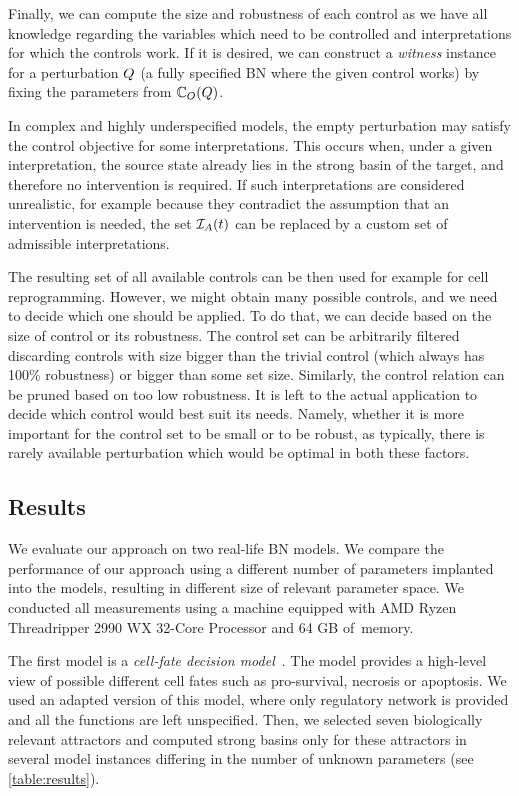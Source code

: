 Finally, we can compute the size and robustness of each control as we have all knowledge regarding the variables which need to be controlled and interpretations for which the controls work. If it is desired, we can construct a \emph{witness} \PBN{} instance for a perturbation $Q$ (a fully specified BN where the given control works) by fixing the parameters from $\mathbb{C}_O(Q)$.

In complex and highly underspecified models, the empty perturbation
\emptyPerturbation may satisfy the control objective for some
interpretations. This occurs when, under a given interpretation, the source
state already lies in the strong basin of the target, and therefore no
intervention is required. If such interpretations are considered unrealistic,
for example because they contradict the assumption that an intervention is
needed, the set $\mathcal{I}_A(t)$ can be replaced by a custom set of
admissible interpretations.

The resulting set of all available controls can be then used for example for cell reprogramming. However, we might obtain many possible controls, and we need to decide which one should be applied. To do that, we can decide based on the size of control or its robustness. The control set can be arbitrarily filtered discarding controls with size bigger than the trivial control (which always has 100\% robustness) or bigger than some set size. Similarly, the control relation can be pruned based on too low robustness. It is left to the actual application to decide which control would best suit its needs. Namely, whether it is more important for the control set to be small or to be robust, as typically, there is rarely available perturbation which would be optimal in both these factors.

\subsection{Results}

\label{sec:results}
We evaluate our approach on two real-life BN models. We compare the performance of our approach using a different number of parameters implanted into the models, resulting in different size of relevant parameter space. We conducted all measurements using a machine equipped with AMD Ryzen Threadripper 2990 WX 32-Core Processor and 64 GB of~memory.

The first model is a \emph{cell-fate decision model}~\cite{Calzone2010}. The model provides a high-level view of possible different cell fates such as pro-survival, necrosis or apoptosis. We used an adapted version of this model, where only regulatory network is provided and all the functions are left unspecified. Then, we selected seven biologically relevant attractors and computed strong basins only for these attractors in several model instances differing in the number of unknown parameters (see \autoref{table:results}).

